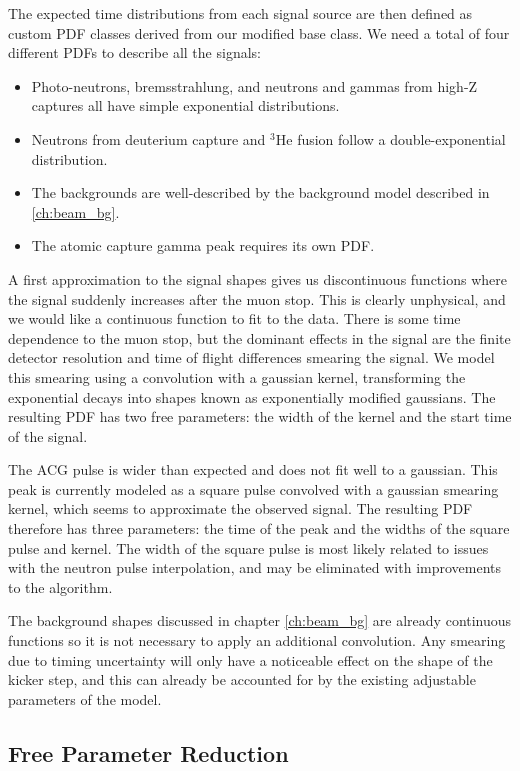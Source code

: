 The expected time distributions from each signal source are then defined as custom PDF classes derived from our modified base class.
We need a total of four different PDFs to describe all the signals:
\begin{itemize}
  \item Photo-neutrons, bremsstrahlung, and neutrons and gammas from high-Z captures all have simple exponential distributions. 
  \item Neutrons from deuterium capture and $^3$He fusion follow a double-exponential distribution.
  \item The backgrounds are well-described by the background model described in \ref{ch:beam_bg}.
  \item The atomic capture gamma peak requires its own PDF.
\end{itemize}

A first approximation to the signal shapes gives us discontinuous functions where the signal suddenly increases after the muon stop.  
This is clearly unphysical, and we would like a continuous function to fit to the data.
There is some time dependence to the muon stop, but the dominant effects in the signal are the finite detector resolution and time of flight differences smearing the signal.
We model this smearing using a convolution with a gaussian kernel, transforming the exponential decays into shapes known as exponentially modified gaussians.
The resulting PDF has two free parameters: the width of the kernel and the start time of the signal.  

The ACG pulse is wider than expected and does not fit well to a gaussian.
This peak is currently modeled as a square pulse convolved with a gaussian smearing kernel, which seems to approximate the observed signal.
The resulting PDF therefore has three parameters: the time of the peak and the widths of the square pulse and kernel.
The width of the square pulse is most likely related to issues with the neutron pulse interpolation, and may be eliminated with improvements to the algorithm. 

The background shapes discussed in chapter \ref{ch:beam_bg} are already continuous functions so it is not necessary to apply an additional convolution.
Any smearing due to timing uncertainty will only have a noticeable effect on the shape of the kicker step, and this can already be accounted for by the existing adjustable parameters of the model.

\subsection{Free Parameter Reduction}

